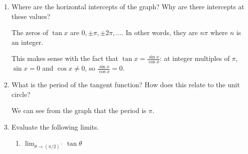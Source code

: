 \documentclass[main]{subfiles}
\begin{document}
\begin{enumerate}[resume]
\begin{enumerate}
    \begin{solution}
      The asymptotes of $\tan x$ occur at $\pm \frac{\pi}{2}, \pm \frac{3
        \pi}{2}, \ldots$.  In other words, they happen at $x =
      \frac{\pi}{2} + n \pi$, where $n$ is any integer.

      This makes sense with the fact that $\tan x = \frac{\sin x}{\cos
        x}$: at $\frac{\pi}{2} + n \pi$, $\cos x = 0$ and $\sin x \neq
      0$. 
    \end{solution}

  \item


    \begin{problem}[\stretch{1}]
      Where are the horizontal intercepts of the graph?  Why are there intercepts at these values?
    \end{problem}

    \begin{solution}
      The zeros of $\tan x$ are $0, \pm \pi, \pm 2 \pi, \ldots$.  In other
      words, they are $n \pi$ where $n$ is an integer.

      This makes sense with the fact that $\tan x = \frac{\sin x}{\cos
        x}$: at integer multiples of $\pi$, $\sin x = 0$ and $\cos x \neq
      0$, so $\frac{\sin x}{\cos x} = 0$.
    \end{solution}

  \item
    \begin{problem}
      What is the period of the tangent function? How does this relate to the unit circle?
    \end{problem}
    \pspace{\vfill}
    
    \begin{solution}
      We can see from the graph that the period is $\pi$. 
    \end{solution}

  \item
    Evaluate the following limits.

    \probonly{}
      \begin{enumerate}
      \item
        \begin{problem}
          $\displaystyle \lim_{\theta \to (\pi/2)^-} \tan \theta$
        \end{problem}


\end{enumerate}
\end{enumerate}
\end{enumerate}
\end{document}
